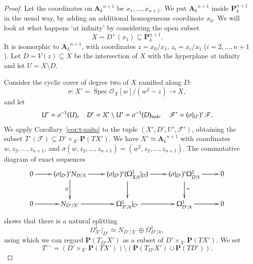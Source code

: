\documentclass[twoside]{amsart}
\renewcommand{\AA}{\mathbf{A}}
\newcommand{\PP}{\mathbf{P}}
\newcommand{\Ff}{\mathscr{F}}
\newcommand{\Oo}{\mathscr{O}}
\DeclareMathOperator{\Spec}{Spec}
\newcommand{\ANK}[2]{{\AA_{#2}}^{\! \! \! \!  #1}} %
\newcommand{\AN}[1]{\ANK{#1}{k}}
\newcommand{\isom}{\simeq}
\renewcommand{\to}{\longrightarrow}
\theoremstyle{plain}
\theoremstyle{definition}
\theoremstyle{remark}
\numberwithin{equation}{subsection}
\begin{document}
\begin{proof}
Let the coordinates on $\AN{n+1}$ be $x_1, \ldots, x_{n+1}$. We put $\AN{n+1}$ inside $\PP^{n+1}_k$ in the usual way, by adding an additional homogeneous coordinate $x_0$. We will look at what happens `at infinity' by considering the open subset 
\[ X = D^+(x_1) \subseteq \PP^{n+1}_k. \]
It is isomorphic to $\AN{n+1}$, with coordinates $z=x_0/x_1$, $z_i = x_i/x_1$ ($i=2, \ldots, n+1$). Let $D=V(z)\subseteq X$ be the intersection of $X$ with the hyperplane at infinity and let $U=X\setminus D$. 

Consider the cyclic cover of degree two of $X$ ramified along $D$:
\[ 
	\sigma \colon X' = \Spec \Oo_X[w]/(w^2 - z) \to X,
\]
and let 
\[ 
	U' = \sigma^{-1}(U), \quad D' = X'\setminus U' = \sigma^{-1}(D)_{\rm red}, \quad \Ff' = (\sigma|_{U'})^* \Ff. 
\] 
We apply Corollary~\ref{cor:t-saito} to the tuple $(X', D', U', \Ff')$, obtaining the subset $T^\circ(\Ff)\subseteq D'\times_{X'} \PP(T X')$.  We have $X'\isom \AN{n+1}$ with coordinates $w, z_2, \ldots, z_{n+1}$, and $\sigma(w, z_2, \ldots, z_{n+1}) = (w^2, z_2, \ldots, z_{n+1})$. The commutative diagram of exact sequences
\[ 
	\xymatrix{
		0\ar[r] & (\sigma|_{D'})^* N_{D/X} \ar[d]_0 \ar[r] & (\sigma|_{D'})^* (\Omega^1_{X/k}|_D) \ar[d]\ar[r] & (\sigma|_{D'})^* \Omega^1_{D/k} \ar[d]^\isom \ar[r] & 0 \\
		0\ar[r] & N_{D'/X'} \ar[r] & \Omega^1_{X'/k}|_{D'} \ar[r] & \Omega^1_{D'/k} \ar[r] & 0 
	}
\]
shows that there is a natural splitting
\[ 
	\Omega^1_{X'}|_{D'} \isom N_{D'/X'} \oplus \Omega^1_{D'/k}, 
\]
using which we can regard $\PP(T_{D'} X')$ as a subset of $D'\times_{X'} \PP(T X')$. We set
\[ 
	T^{\circ\circ} = \left(D'\times_{X'} \PP(T X')\right) \setminus \left(\PP(T_{D'} X')\cup \PP(T D')\right).
\]


\end{proof}
\end{document}
